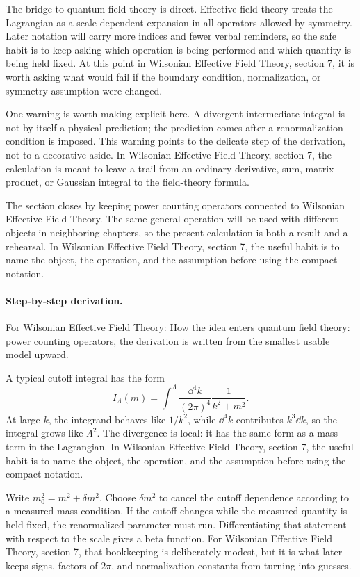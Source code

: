 The bridge to quantum field theory is direct.  Effective field theory treats the Lagrangian as a scale-dependent expansion in all operators allowed by symmetry.  Later notation will carry more indices and fewer verbal reminders, so the safe habit is to keep asking which operation is being performed and which quantity is being held fixed.  At this point in Wilsonian Effective Field Theory, section 7, it is worth asking what would fail if the boundary condition, normalization, or symmetry assumption were changed.

One warning is worth making explicit here.  A divergent intermediate integral is not by itself a physical prediction; the prediction comes after a renormalization condition is imposed.  This warning points to the delicate step of the derivation, not to a decorative aside.  In Wilsonian Effective Field Theory, section 7, the calculation is meant to leave a trail from an ordinary derivative, sum, matrix product, or Gaussian integral to the field-theory formula.

The section closes by keeping power counting operators connected to Wilsonian Effective Field Theory.  The same general operation will be used with different objects in neighboring chapters, so the present calculation is both a result and a rehearsal.  In Wilsonian Effective Field Theory, section 7, the useful habit is to name the object, the operation, and the assumption before using the compact notation.



\paragraph{Step-by-step derivation.}

For Wilsonian Effective Field Theory: How the idea enters quantum field theory: power counting operators, the derivation is written from the smallest usable model upward.

A typical cutoff integral has the form
\[
  I_\Lambda(m)=\int^{\Lambda}\frac{\dd^4k}{(2\pi)^4}\frac{1}{k^2+m^2}.
\]
At large \(k\), the integrand behaves like \(1/k^2\), while \(\dd^4k\) contributes \(k^3\dd k\), so the integral grows like \(\Lambda^2\).  The divergence is local: it has the same form as a mass term in the Lagrangian.  In Wilsonian Effective Field Theory, section 7, the useful habit is to name the object, the operation, and the assumption before using the compact notation.

Write \(m_0^2=m^2+\delta m^2\).  Choose \(\delta m^2\) to cancel the cutoff dependence according to a measured mass condition.  If the cutoff changes while the measured quantity is held fixed, the renormalized parameter must run.  Differentiating that statement with respect to the scale gives a beta function.  For Wilsonian Effective Field Theory, section 7, that bookkeeping is deliberately modest, but it is what later keeps signs, factors of \(2\pi\), and normalization constants from turning into guesses.

